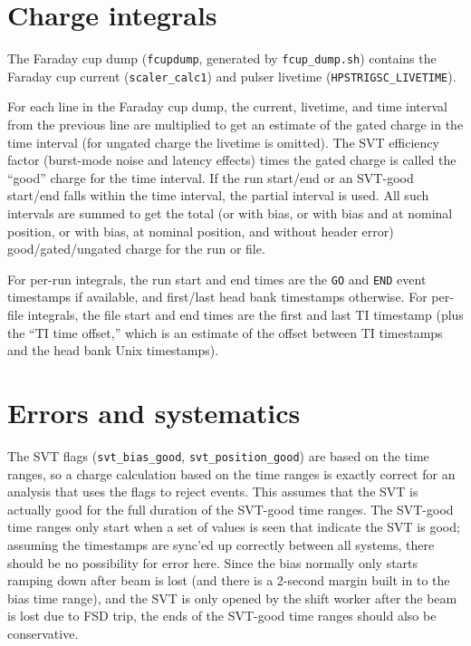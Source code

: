 \documentclass[aps,amsmath,amssymb,notitlepage,10pt,onecolumn]{revtex4-1}
\begin{document}
\section{Charge integrals}
The Faraday cup dump (\texttt{fcupdump}, generated by \texttt{fcup\_dump.sh}) contains the Faraday cup current (\texttt{scaler\_calc1}) and pulser livetime (\texttt{HPSTRIGSC\_LIVETIME}).

For each line in the Faraday cup dump, the current, livetime, and time interval from the previous line are multiplied to get an estimate of the gated charge in the time interval (for ungated charge the livetime is omitted).
The SVT efficiency factor (burst-mode noise and latency effects) times the gated charge is called the ``good'' charge for the time interval.
If the run start/end or an SVT-good start/end falls within the time interval, the partial interval is used.
All such intervals are summed to get the total (or with bias, or with bias and at nominal position, or with bias, at nominal position, and without header error) good/gated/ungated charge for the run or file.

For per-run integrals, the run start and end times are the \texttt{GO} and \texttt{END} event timestamps if available, and first/last head bank timestamps otherwise.
For per-file integrals, the file start and end times are the first and last TI timestamp (plus the ``TI time offset,'' which is an estimate of the offset between TI timestamps and the head bank Unix timestamps).

\section{Errors and systematics}
The SVT flags (\texttt{svt\_bias\_good}, \texttt{svt\_position\_good}) are based on the time ranges, so a charge calculation based on the time ranges is exactly correct for an analysis that uses the flags to reject events.
This assumes that the SVT is actually good for the full duration of the SVT-good time ranges.
The SVT-good time ranges only start when a set of values is seen that indicate the SVT is good; assuming the timestamps are sync'ed up correctly between all systems, there should be no possibility for error here.
Since the bias normally only starts ramping down after beam is lost (and there is a 2-second margin built in to the bias time range), and the SVT is only opened by the shift worker after the beam is lost due to FSD trip, the ends of the SVT-good time ranges should also be conservative.
\end{document}
